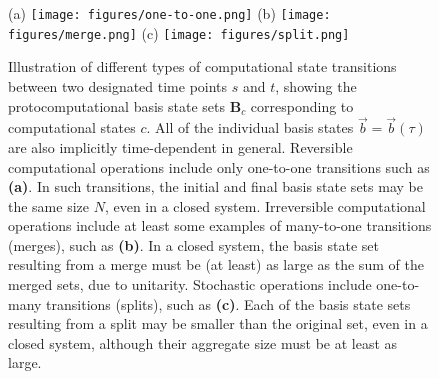\documentclass[preprints,article,accept,moreauthors,pdftex]{Definitions/mdpi}
\begin{document}
\begin{figure}[h]	
\widefigure
(a) \texttt{[image: figures/one-to-one.png]}
\hspace{0.6 cm}(b) \texttt{[image: figures/merge.png]}
\hspace{0.6 cm}(c) \texttt{[image: figures/split.png]}
\caption{Illustration of different types of computational state transitions between two designated time points $s$ and $t$, showing the protocomputational basis state sets $\boldsymbol{B}_c$ corresponding to computational states $c$. All of the individual basis states $\vec{b} = \vec{b}(\tau)$ are also implicitly time-dependent in general. Reversible computational operations include only one-to-one transitions such as \textbf{(a)}. In such transitions, the initial and final basis state sets may be the same size $N$, even in a closed system. Irreversible computational operations include at least some examples of many-to-one transitions (merges), such as \textbf{(b)}. In a closed system, the basis state set resulting from a merge must be (at least) as large as the sum of the merged sets, due to unitarity. Stochastic operations include one-to-many transitions (splits), such as \textbf{(c)}. Each of the basis state sets resulting from a split may be smaller than the original set, even in a closed system, although their aggregate size must be at least as large.\label{fig:transitions}}
\end{figure}  
\end{document}
